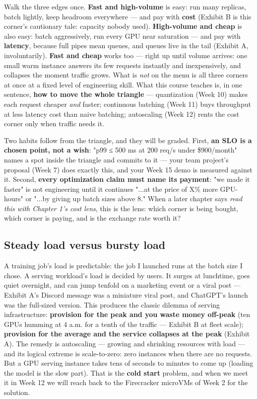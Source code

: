 Walk the three edges once. \textbf{Fast and high-volume} is easy: run many replicas, batch lightly, keep headroom everywhere — and pay with \textbf{cost} (Exhibit B is this corner's cautionary tale: capacity nobody used). \textbf{High-volume and cheap} is also easy: batch aggressively, run every GPU near saturation — and pay with \textbf{latency}, because full pipes mean queues, and queues live in the tail (Exhibit A, involuntarily). \textbf{Fast and cheap} works too — right up until volume arrives: one small warm instance answers its few requests instantly and inexpensively, and collapses the moment traffic grows. What is \textit{not} on the menu is all three corners at once at a fixed level of engineering skill. What this course teaches is, in one sentence, \textbf{how to move the whole triangle} — quantization (Week 10) makes each request cheaper \textit{and} faster; continuous batching (Week 11) buys throughput at less latency cost than naive batching; autoscaling (Week 12) rents the cost corner only when traffic needs it.

Two habits follow from the triangle, and they will be graded. First, \textbf{an SLO is a chosen point, not a wish}: "p99 ≤ 500 ms at 200 req/s under \$900/month" names a spot inside the triangle and commits to it — your team project's proposal (Week 7) does exactly this, and your Week 15 demo is measured against it. Second, \textbf{every optimization claim must name its payment}: "we made it faster" is not engineering until it continues "...at the price of X\% more GPU-hours" or "...by giving up batch sizes above 8." When a later chapter says \textit{read this with Chapter 1's cost lens}, this is the lens: which corner is being bought, which corner is paying, and is the exchange rate worth it?

\subsection*{Steady load versus bursty load}

A training job's load is predictable: the job I launched runs at the batch size I chose. A serving workload's load is decided by users. It surges at lunchtime, goes quiet overnight, and can jump tenfold on a marketing event or a viral post — Exhibit A's Discord message was a miniature viral post, and ChatGPT's launch was the full-sized version. This produces the classic dilemma of serving infrastructure: \textbf{provision for the peak and you waste money off-peak} (ten GPUs humming at 4 a.m. for a tenth of the traffic — Exhibit B at fleet scale); \textbf{provision for the average and the service collapses at the peak} (Exhibit A). The remedy is autoscaling — growing and shrinking resources with load — and its logical extreme is scale-to-zero: zero instances when there are no requests. But a GPU serving instance takes tens of seconds to minutes to come up (loading the model is the slow part). That is the \textbf{cold start} problem, and when we meet it in Week 12 we will reach back to the Firecracker microVMs of Week 2 for the solution.

